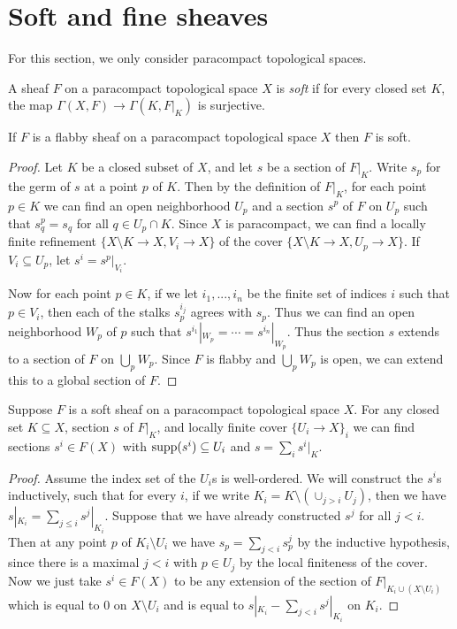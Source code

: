 \section{Soft and fine sheaves}

For this section, we only consider paracompact topological spaces.

\begin{defn} A sheaf $F$ on a paracompact topological space $X$ is \emph{soft} if for every closed set $K$, the map $\Gamma(X,F) \rightarrow \Gamma(K,F|_K)$ is surjective.
\end{defn}

\begin{prop}\label{flabbysoft} If $F$ is a flabby sheaf on a paracompact topological space $X$ then $F$ is soft.
\end{prop}
\begin{proof} Let $K$ be a closed subset of $X$, and let $s$ be a section of $F|_K$. Write $s_p$ for the germ of $s$ at a point $p$ of $K$. Then by the definition of $F|_K$, for each point $p\in K$ we can find an open neighborhood $U_p$ and a section $s^p$ of $F$ on $U_p$ such that $s^p_q = s_q$ for all $q\in U_p\cap K$. Since $X$ is paracompact, we can find a locally finite refinement $\{X\setminus K\rightarrow X, V_i\rightarrow X\}$ of the cover $\{X\setminus K\rightarrow X, U_p\rightarrow X\}$. If $V_i\subseteq U_p$, let $s^i = s^p|_{V_i}$.

Now for each point $p\in K$, if we let $i_1, ..., i_n$ be the finite set of indices $i$ such that $p\in V_i$, then each of the stalks $s^{i_j}_p$ agrees with $s_p$. Thus we can find an open neighborhood $W_p$ of $p$ such that $s^{i_1}|_{W_p} = \cdots = s^{i_n}|_{W_p}$. Thus the section $s$ extends to a section of $F$ on $\bigcup_p W_p$. Since $F$ is flabby and $\bigcup_p W_p$ is open, we can extend this to a global section of $F$.
\end{proof}

\begin{prop} Suppose $F$ is a soft sheaf on a paracompact topological space $X$. For any closed set $K\subseteq X$, section $s$ of $F|_K$, and locally finite cover $\{U_i \rightarrow X\}_i$ we can find sections $s^i\in F(X)$ with $\mbox{\rm supp}(s^i)\subseteq U_i$ and $s = \sum_i s^i|_K$.
\end{prop}
\begin{proof} Assume the index set of the $U_i$s is well-ordered. We will construct the $s^i$s inductively, such that for every $i$, if we write $K_i = K\setminus(\cup_{j>i}U_j)$, then we have $s|_{K_i} = \sum_{j \le i}s^j|_{K_i}$. Suppose that we have already constructed $s^j$ for all $j < i$. Then at any point $p$ of $K_i \setminus U_i$ we have $s_p = \sum_{j < i}s^j_p$ by the inductive hypothesis, since there is a maximal $j < i$ with $p\in U_j$ by the local finiteness of the cover. Now we just take $s^i\in F(X)$ to be any extension of the section of $F|_{K_i\cup (X\setminus U_i)}$ which is equal to $0$ on $X\setminus U_i$ and is equal to $s|_{K_i} - \sum_{j < i}s^j|_{K_i}$ on $K_i$.
\end{proof}

